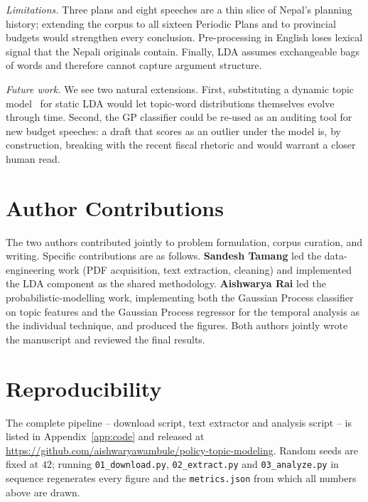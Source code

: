 \documentclass[conference]{IEEEtran}
\begin{document}
\emph{Limitations.}  Three plans and eight speeches are a thin slice
of Nepal's planning history; extending the corpus to all sixteen
Periodic Plans and to provincial budgets would strengthen every
conclusion.  Pre-processing in English loses lexical signal that the
Nepali originals contain.  Finally, LDA assumes exchangeable bags of
words and therefore cannot capture argument structure.

\emph{Future work.}  We see two natural extensions.  First,
substituting a dynamic topic model~\cite{blei2006dynamic} for static
LDA would let topic-word distributions themselves evolve through
time.  Second, the GP classifier could be re-used as an auditing tool
for new budget speeches: a draft that scores as an outlier under the
model is, by construction, breaking with the recent fiscal rhetoric
and would warrant a closer human read.

\section*{Author Contributions}
The two authors contributed jointly to problem formulation, corpus
curation, and writing.  Specific contributions are as follows.
\textbf{Sandesh Tamang} led the data-engineering work (PDF
acquisition, text extraction, cleaning) and implemented the LDA
component as the shared methodology.  \textbf{Aishwarya Rai} led the
probabilistic-modelling work, implementing both the Gaussian Process
classifier on topic features and the Gaussian Process regressor for
the temporal analysis as the individual technique, and produced the
figures.  Both authors jointly wrote the manuscript and reviewed the
final results.

\section*{Reproducibility}
The complete pipeline -- download script, text extractor and analysis
script -- is listed in Appendix~\ref{app:code} and released at
\url{https://github.com/aishwaryawambule/policy-topic-modeling}.
Random seeds are fixed at $42$; running \texttt{01\_download.py},
\texttt{02\_extract.py} and \texttt{03\_analyze.py} in sequence
regenerates every figure and the \texttt{metrics.json} from which all
numbers above are drawn.
\end{document}
